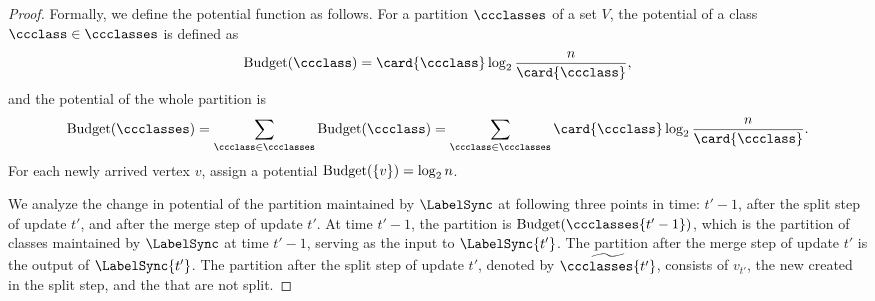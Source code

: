 \begin{proof}
    Formally, we define the potential function as follows. For a partition $ \ccclasses $ of a set $ V $, the potential of a class $ \ccclass\in\ccclasses $ is defined as
    \begin{align}
        \potential{\ccclass} = \card{\ccclass}\log_{2} \frac{n}{\card{\ccclass}}, \nonumber
    \end{align}
    and the potential of the whole partition is
    \begin{align}
        \potential{\ccclasses} = \sum_{\ccclass\in\ccclasses} \potential{\ccclass} = \sum_{\ccclass\in\ccclasses} \card{\ccclass}\log_{2} \frac{n}{\card{\ccclass}}. \nonumber
    \end{align}
    For each newly arrived vertex $ v $, assign a potential $ \mathrm{Budget}(\{v\}) = \log_{2}n $.

    We analyze the change in potential of the partition maintained by $ \LabelSync $ at following three points in time: $ t'-1 $, after the split step of update $ t' $, and after the merge step of update $ t' $.
    At time $ t'-1 $, the partition is $ \potential{\ccclasses{t'-1}} $, which is the partition of classes maintained by $ \LabelSync $ at time $ t'-1 $, serving as the input to $ \LabelSync{t'} $. The partition after the merge step of update $ t' $ is the output of $ \LabelSync{t'} $. The partition after the split step of update $ t' $, denoted by $ \widetilde{\ccclasses{t'}} $, consists of $ v_{t'} $, the new  created in the split step, and the  that are not split.


\end{proof}
